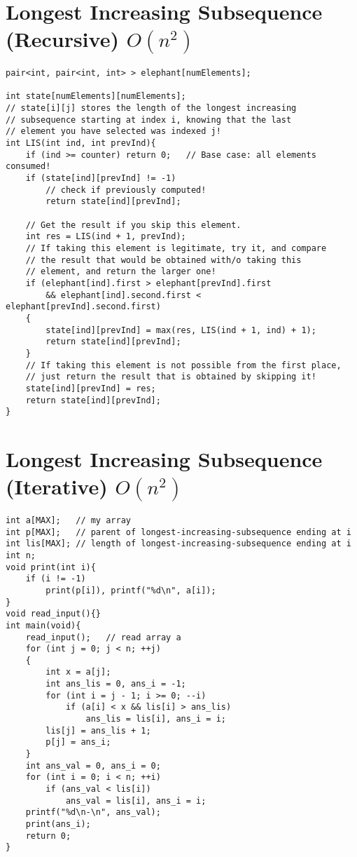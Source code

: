 \documentclass[12pt]{book}
\begin{document}
\section{Longest Increasing Subsequence (Recursive) $O(n^2)$}
\begin{verbatim}
pair<int, pair<int, int> > elephant[numElements];

int state[numElements][numElements];
// state[i][j] stores the length of the longest increasing
// subsequence starting at index i, knowing that the last
// element you have selected was indexed j!
int LIS(int ind, int prevInd){
	if (ind >= counter) return 0;	// Base case: all elements consumed!
	if (state[ind][prevInd] != -1)
		// check if previously computed!
		return state[ind][prevInd];

	// Get the result if you skip this element.
	int res = LIS(ind + 1, prevInd);
	// If taking this element is legitimate, try it, and compare
	// the result that would be obtained with/o taking this
	// element, and return the larger one!
	if (elephant[ind].first > elephant[prevInd].first
		&& elephant[ind].second.first < elephant[prevInd].second.first)
	{
		state[ind][prevInd] = max(res, LIS(ind + 1, ind) + 1);
		return state[ind][prevInd];
	}
	// If taking this element is not possible from the first place,
	// just return the result that is obtained by skipping it!
	state[ind][prevInd] = res;
	return state[ind][prevInd];
}
\end{verbatim}
\section{Longest Increasing Subsequence (Iterative) $O(n^2)$}
\begin{verbatim}
int a[MAX];   // my array
int p[MAX];   // parent of longest-increasing-subsequence ending at i
int lis[MAX]; // length of longest-increasing-subsequence ending at i
int n;
void print(int i){
	if (i != -1)
		print(p[i]), printf("%d\n", a[i]);
}
void read_input(){}
int main(void){
	read_input();	// read array a
	for (int j = 0; j < n; ++j)
	{
		int x = a[j];
		int ans_lis = 0, ans_i = -1;
		for (int i = j - 1; i >= 0; --i)
			if (a[i] < x && lis[i] > ans_lis)
				ans_lis = lis[i], ans_i = i;
		lis[j] = ans_lis + 1;
		p[j] = ans_i;
	}
	int ans_val = 0, ans_i = 0;
	for (int i = 0; i < n; ++i)
		if (ans_val < lis[i])
			ans_val = lis[i], ans_i = i;
	printf("%d\n-\n", ans_val);
	print(ans_i);
	return 0;
}
\end{verbatim}
\end{document}
